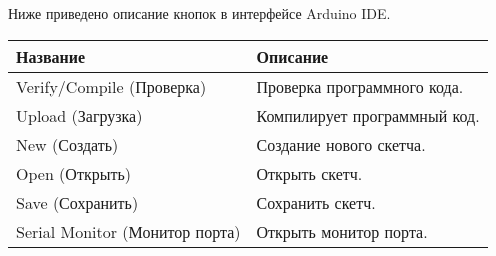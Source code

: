 \documentclass[../main.tex]{subfiles}
\begin{document}
Ниже приведено описание кнопок в интерфейсе Arduino IDE.


\begin{tabular}{p{4cm}|p{6cm}}
  Название & Описание \\
  \hline \hline
  Verify/Compile (Проверка) & Проверка программного кода. \\
  \hline
  Upload (Загрузка) & Компилирует программный код.\\
  \hline
  New (Создать) & Создание нового скетча.\\
  \hline
  Open (Открыть) & Открыть скетч.\\
  \hline
  Save (Сохранить) & Сохранить скетч.\\
  \hline
  Serial Monitor (Монитор порта) & Открыть монитор порта.\\
\end{tabular}
\end{document}
